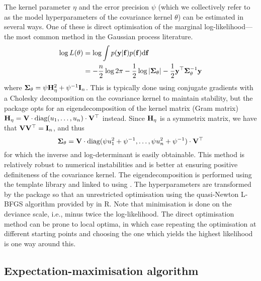 The kernel parameter $\eta$ and the error precision $\psi$ (which we collectively refer to as the model hyperparameters of the covariance kernel $\theta$) can be estimated in several ways.
One of these is direct optimisation of the marginal log-likelihood---the most common method in the Gaussian process literature.
%
\begin{align*}
  \log L(\theta)
  &= \log \int p(\by|\bff)p(\bff) \d \bff \\
  &= -\half[n]\log 2\pi - \half\log\vert \bSigma_\theta \vert - \half \by^\top \bSigma_\theta^{-1} \by
\end{align*}
%
where $\bSigma_\theta = \psi\bH_\eta^2 + \psi^{-1}\bI_n$.
This is typically done using conjugate gradients with a Cholesky decomposition on the covariance kernel to maintain stability, but the  package opts for an eigendecomposition of the kernel matrix (Gram matrix) $\bH_{\eta} = \bV\cdot\text{diag}(u_1,\dots,u_n)\cdot\bV^\top$ instead.
Since $\bH_{\eta}$ is a symmetrix matrix, we have that $\bV\bV^\top = \bI_n$, and thus
%
\[
  \bSigma_\theta = \bV \cdot \text{diag} (\psi u_1^2 + \psi^{-1},\dots,\psi u_n^2 + \psi^{-1}) \cdot \bV^\top
\]
%
for which the inverse and log-determinant is easily obtainable.
This method is relatively robust to numerical instabilities and is better at ensuring positive definiteness of the covariance kernel.
The eigendecomposition is performed using the   template library and linked to  using  \citep{eddelbuettel2011rcpp}.
The hyperparameters are transformed by the  package so that an unrestricted optimisation using the quasi-Newton L-BFGS algorithm provided by  in \proglang R.
Note that minimisation is done on the deviance scale, i.e., minus twice the log-likelihood.
The direct optimisation method can be prone to local optima, in which case repeating the optimisation at different starting points and choosing the one which yields the highest likelihood is one way around this.

\subsection{Expectation-maximisation algorithm}

